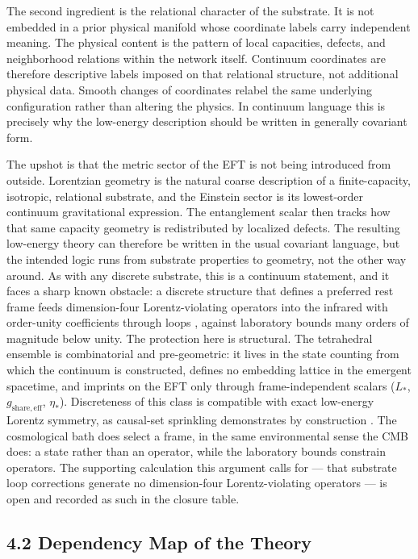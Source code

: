 \documentclass[11pt]{article}
\begin{document}
The second ingredient is the relational character of the substrate. It is not embedded in a prior physical manifold whose coordinate labels carry independent meaning. The physical content is the pattern of local capacities, defects, and neighborhood relations within the network itself. Continuum coordinates are therefore descriptive labels imposed on that relational structure, not additional physical data. Smooth changes of coordinates relabel the same underlying configuration rather than altering the physics. In continuum language this is precisely why the low-energy description should be written in generally covariant form.

The upshot is that the metric sector of the EFT is not being introduced from outside. Lorentzian geometry is the natural coarse description of a finite-capacity, isotropic, relational substrate, and the Einstein sector is its lowest-order continuum gravitational expression. The entanglement scalar then tracks how that same capacity geometry is redistributed by localized defects. The resulting low-energy theory can therefore be written in the usual covariant language, but the intended logic runs from substrate properties to geometry, not the other way around. As with any discrete substrate, this is a continuum statement, and it faces a sharp known obstacle: a discrete structure that defines a preferred rest frame feeds dimension-four Lorentz-violating operators into the infrared with order-unity coefficients through loops \citep{Collins2004}, against laboratory bounds many orders of magnitude below unity. The protection here is structural. The tetrahedral ensemble is combinatorial and pre-geometric: it lives in the state counting from which the continuum is constructed, defines no embedding lattice in the emergent spacetime, and imprints on the EFT only through frame-independent scalars ($L_*$, $g_{\mathrm{share,eff}}$, $\eta_*$). Discreteness of this class is compatible with exact low-energy Lorentz symmetry, as causal-set sprinkling demonstrates by construction \citep{Bombelli1987,Dowker2004}. The cosmological bath does select a frame, in the same environmental sense the CMB does: a state rather than an operator, while the laboratory bounds constrain operators. The supporting calculation this argument calls for --- that substrate loop corrections generate no dimension-four Lorentz-violating operators --- is open and recorded as such in the closure table.

\subsection{4.2 Dependency Map of the Theory}
\end{document}
